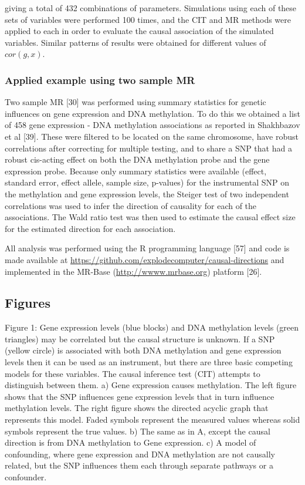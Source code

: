 \documentclass[]{article}
\begin{document}
giving a total of 432 combinations of parameters. Simulations using each
of these sets of variables were performed 100 times, and the CIT and MR
methods were applied to each in order to evaluate the causal association
of the simulated variables. Similar patterns of results were obtained
for different values of \(cor(g, x)\).

\subsubsection{Applied example using two sample
MR}\label{applied-example-using-two-sample-mr}

Two sample MR {[}30{]} was performed using summary statistics for
genetic influences on gene expression and DNA methylation. To do this we
obtained a list of 458 gene expression - DNA methylation associations as
reported in Shakhbazov et al {[}39{]}. These were filtered to be located
on the same chromosome, have robust correlations after correcting for
multiple testing, and to share a SNP that had a robust cis-acting effect
on both the DNA methylation probe and the gene expression probe. Because
only summary statistics were available (effect, standard error, effect
allele, sample size, p-values) for the instrumental SNP on the
methylation and gene expression levels, the Steiger test of two
independent correlations was used to infer the direction of causality
for each of the associations. The Wald ratio test was then used to
estimate the causal effect size for the estimated direction for each
association.

All analysis was performed using the R programming language {[}57{]} and
code is made available at
\url{https://github.com/explodecomputer/causal-directions} and
implemented in the MR-Base (\url{http://wwww.mrbase.org}) platform
{[}26{]}.

\newpage

\subsection{Figures}\label{figures}

Figure 1: Gene expression levels (blue blocks) and DNA methylation
levels (green triangles) may be correlated but the causal structure is
unknown. If a SNP (yellow circle) is associated with both DNA
methylation and gene expression levels then it can be used as an
instrument, but there are three basic competing models for these
variables. The causal inference test (CIT) attempts to distinguish
between them. a) Gene expression causes methylation. The left figure
shows that the SNP influences gene expression levels that in turn
influence methylation levels. The right figure shows the directed
acyclic graph that represents this model. Faded symbols represent the
measured values whereas solid symbols represent the true values. b) The
same as in A, except the causal direction is from DNA methylation to
Gene expression. c) A model of confounding, where gene expression and
DNA methylation are not causally related, but the SNP influences them
each through separate pathways or a confounder.
\end{document}
